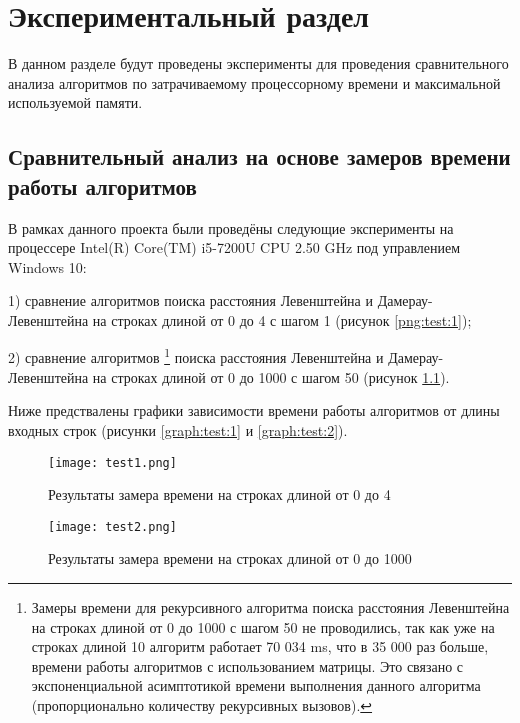 \chapter{Экспериментальный раздел}
\label{cha:research}
    В данном разделе будут проведены эксперименты для проведения 
    сравнительного анализа алгоритмов по затрачиваемому процессорному 
    времени\cite{CPU-time} и максимальной используемой памяти.
    \section{Сравнительный анализ на основе замеров времени работы алгоритмов}
        В рамках данного проекта были проведёны следующие эксперименты на процессере
        Intel(R) Core(TM) i5-7200U CPU 2.50 GHz \cite{processor-i5-7200u}
        под управлением Windows 10:
        
        1) сравнение алгоритмов поиска расстояния Левенштейна и Дамерау-Левенштейна
        на строках длиной от 0 до 4 с шагом 1 (рисунок \ref{png:test:1});
        
        2) сравнение алгоритмов \footnote{Замеры времени для рекурсивного алгоритма поиска расстояния Левенштейна
        на строках длиной от 0 до 1000 с шагом 50 не проводились, так как уже на 
        строках длиной 10 алгоритм работает 70 034 ms, что в 35 000 раз больше, 
        времени работы алгоритмов с использованием матрицы. Это связано с экспоненциальной асимптотикой
        времени выполнения данного алгоритма (пропорционально количеству
        рекурсивных вызовов).} поиска расстояния Левенштейна и Дамерау-Левенштейна
        на строках длиной от 0 до 1000 с шагом 50 (рисунок \ref{png:test:2}).
        


        Ниже предствалены графики зависимости времени работы алгоритмов от длины входных строк
        (рисунки \ref{graph:test:1} и \ref{graph:test:2}).

        \begin{figure}[h!]
            \centering
            \texttt{[image: test1.png]}
            \caption{Результаты замера времени на строках длиной от 0 до 4}
            \label{png:test:1}
        
            \texttt{[image: test2.png]}
            \caption{Результаты замера времени на строках длиной от 0 до 1000}
            \label{png:test:2}
        \end{figure}
    
